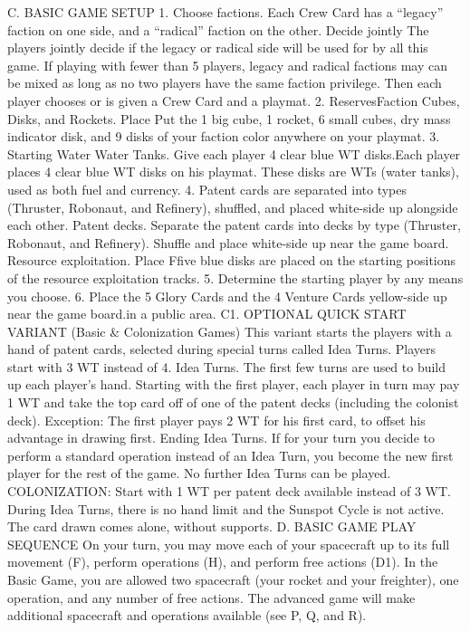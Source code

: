 \documentclass[a4paper]{book}
\begin{document}
C. BASIC GAME SETUP
1.  Choose factions. Each Crew Card has a “legacy” faction on one side, and a “radical” faction on the other. Decide jointly The players jointly decide if the legacy or radical side will be used for by all this game. If playing with fewer than 5 players, legacy and radical factions may can be mixed as long as no two players have the same faction privilege. Then each player chooses or is given a Crew Card and a playmat.
2.  ReservesFaction Cubes, Disks, and Rockets. Place Put the 1 big cube, 1 rocket, 6 small cubes, dry mass indicator disk, and 9 disks of your faction color anywhere on your playmat.
3.  Starting Water Water Tanks. Give each player 4 clear blue WT disks.Each player places 4 clear blue WT disks on his playmat. These disks are WTs (water tanks), used as both fuel and currency.
4.  Patent cards are separated into types (Thruster, Robonaut, and Refinery), shuffled, and placed white-side up alongside each other. Patent decks. Separate the patent cards into decks by type (Thruster, Robonaut, and Refinery). Shuffle and place white-side up near the game board.
Resource exploitation. Place Ffive blue disks are placed on the starting positions of the resource exploitation tracks.
5.  Determine the starting player by any means you choose.
6.  Place the 5 Glory Cards and the 4 Venture Cards yellow-side up near the game board.in a public area.
C1. OPTIONAL QUICK START VARIANT (Basic \& Colonization Games)
This variant starts the players with a hand of patent cards, selected during special turns called Idea Turns.
Players start with 3 WT instead of 4.
Idea Turns. The first few turns are used to build up each player’s hand. Starting with the first player, each player in turn may pay 1 WT and take the top card off of one of the patent decks (including the colonist deck). Exception: The first player pays 2 WT for his first card, to offset his advantage in drawing first.
Ending Idea Turns. If for your turn you decide to perform a standard operation instead of an Idea Turn, you become the new first player for the rest of the game. No further Idea Turns can be played.
COLONIZATION: Start with 1 WT per patent deck available instead of 3 WT. During Idea Turns, there is no hand limit and the Sunspot Cycle is not active. The card drawn comes alone, without supports.
D. BASIC GAME PLAY SEQUENCE
On your turn, you may move each of your spacecraft up to its full movement (F), perform operations (H), and perform free actions (D1). In the Basic Game, you are allowed two spacecraft (your rocket and your freighter), one operation, and any number of free actions. The advanced game will make additional spacecraft and operations available (see P, Q, and R).
\end{document}
